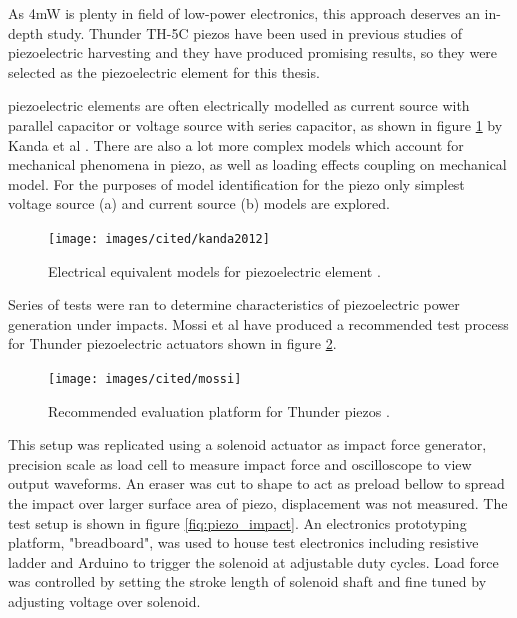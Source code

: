 As 4mW is plenty in field of low-power electronics, this approach deserves an in-depth study. Thunder TH-5C piezos have been used in previous studies of piezoelectric harvesting and they have produced promising results, so they were selected as the piezoelectric element for this thesis.

piezoelectric elements are often electrically modelled as current source with parallel capacitor or voltage source with series capacitor, as shown in figure \ref{fig:piezo_equivalents} by Kanda et al \cite{Kanda2012}. There are also a lot more complex models which account for mechanical phenomena in piezo, as well as loading effects coupling on mechanical model. For the purposes of model identification for the piezo only simplest voltage source (a) and current source (b) models are explored.

\begin{figure}[htb]
  \begin{center}
  \texttt{[image: images/cited/kanda2012]}
  \end{center}
  \caption{Electrical equivalent models for piezoelectric element \cite{Kanda2012}.}
  \label{fig:piezo_equivalents}
\end{figure}

Series of tests were ran to determine characteristics of piezoelectric power generation under impacts. Mossi et al \cite{Mossi} have produced a recommended test process for Thunder piezoelectric actuators shown in figure \ref{fiq:thunder_eval}.

\begin{figure}[htb]
  \begin{center}
  \texttt{[image: images/cited/mossi]}
  \end{center}
  \caption{Recommended evaluation platform for Thunder piezos \cite{Mossi}.}
  \label{fiq:thunder_eval}
\end{figure}

This setup was replicated using a solenoid actuator as impact force generator, precision scale as load cell to measure impact force and oscilloscope to view output waveforms. An eraser was cut to shape to act as preload bellow to spread the impact over larger surface area of piezo, displacement was not measured. The test setup is shown in figure \ref{fiq:piezo_impact}. An electronics prototyping platform, "breadboard", was used to house test electronics including resistive ladder and Arduino to trigger the solenoid at adjustable duty cycles. Load force was controlled by setting the stroke length of solenoid shaft and fine tuned by adjusting voltage over solenoid. 

